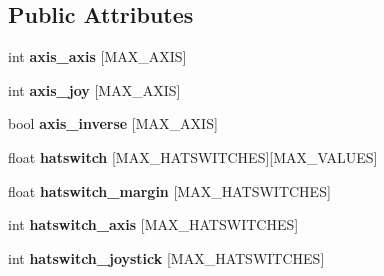 \subsection*{Public Attributes}
\begin{DoxyCompactItemize}
\item 
int {\bfseries axis\+\_\+axis} \mbox{[}M\+A\+X\+\_\+\+A\+X\+IS\mbox{]}\hypertarget{classVegaConfig_a24785fedf7e609d10b0f6ea62540c96f}{}\label{classVegaConfig_a24785fedf7e609d10b0f6ea62540c96f}

\item 
int {\bfseries axis\+\_\+joy} \mbox{[}M\+A\+X\+\_\+\+A\+X\+IS\mbox{]}\hypertarget{classVegaConfig_ad63927bf6afb981ce398162b1612a98f}{}\label{classVegaConfig_ad63927bf6afb981ce398162b1612a98f}

\item 
bool {\bfseries axis\+\_\+inverse} \mbox{[}M\+A\+X\+\_\+\+A\+X\+IS\mbox{]}\hypertarget{classVegaConfig_a90e516ff978739a5e5262b04ae8ea14a}{}\label{classVegaConfig_a90e516ff978739a5e5262b04ae8ea14a}

\item 
float {\bfseries hatswitch} \mbox{[}M\+A\+X\+\_\+\+H\+A\+T\+S\+W\+I\+T\+C\+H\+ES\mbox{]}\mbox{[}M\+A\+X\+\_\+\+V\+A\+L\+U\+ES\mbox{]}\hypertarget{classVegaConfig_a7b4f206e5e6d67b3df39872049400214}{}\label{classVegaConfig_a7b4f206e5e6d67b3df39872049400214}

\item 
float {\bfseries hatswitch\+\_\+margin} \mbox{[}M\+A\+X\+\_\+\+H\+A\+T\+S\+W\+I\+T\+C\+H\+ES\mbox{]}\hypertarget{classVegaConfig_a2267baabc15de27c7818d194508c8d27}{}\label{classVegaConfig_a2267baabc15de27c7818d194508c8d27}

\item 
int {\bfseries hatswitch\+\_\+axis} \mbox{[}M\+A\+X\+\_\+\+H\+A\+T\+S\+W\+I\+T\+C\+H\+ES\mbox{]}\hypertarget{classVegaConfig_af1a100931c6a584ca9f84cb10144bc00}{}\label{classVegaConfig_af1a100931c6a584ca9f84cb10144bc00}

\item 
int {\bfseries hatswitch\+\_\+joystick} \mbox{[}M\+A\+X\+\_\+\+H\+A\+T\+S\+W\+I\+T\+C\+H\+ES\mbox{]}\hypertarget{classVegaConfig_a1201233e07117f8b30a48432d7ce2a0a}{}\label{classVegaConfig_a1201233e07117f8b30a48432d7ce2a0a}

\end{DoxyCompactItemize}
